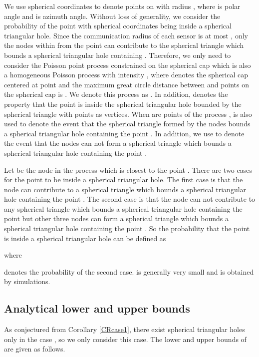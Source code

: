\documentclass[journal, twoside]{IEEEtran}
\begin{document}
We use spherical coordinates  to denote points on  with radius ,
where  is polar angle and  is azimuth angle. Without loss of generality, we
consider the probability of the point  with spherical coordinates  being inside a
spherical triangular hole. Since the communication radius of each sensor is 
at most , only the nodes within  from the point  can
contribute to the spherical triangle which bounds a spherical triangular hole containing . 
Therefore, we only need to consider the Poisson point
process constrained on the spherical cap  which is also a
homogeneous Poisson process with intensity , where 
denotes the spherical cap centered at point  and the maximum great circle
distance between  and points on the spherical cap is . We denote this
process as . In addition,  denotes the property that
the point  is inside the spherical triangular hole
bounded by the spherical triangle with points  as vertices. When  are points of the process ,  is also used
to denote the event that the spherical triangle formed by the nodes  bounds a spherical triangular hole containing the point . In addition,
we use  to denote the event that the nodes
 can not form a spherical triangle which bounds a spherical triangular hole 
containing the point .

Let  be the node in the process  which is
closest to the point . There are two cases for the point  to be inside a
spherical triangular hole. The first case is that the node  can contribute to
a spherical triangle which bounds a spherical triangular hole containing the point . The
second case is that the node  can not contribute to any spherical triangle
which bounds a spherical triangular hole containing the point  but other three
nodes can form a spherical triangle which bounds a spherical triangular hole containing the 
point . So the probability that the point  is inside a spherical triangular hole 
can be defined as 

where 

\noindent denotes the probability of the second case.  is generally very
small and is obtained by simulations.

\subsection{Analytical lower and upper bounds} \label{secboundcase2}

As conjectured from Corollary \ref{CRcase1}, there exist spherical
triangular holes only in the case , 
so we only consider this case. The lower and upper bounds of 
are given as follows.
\end{document}

